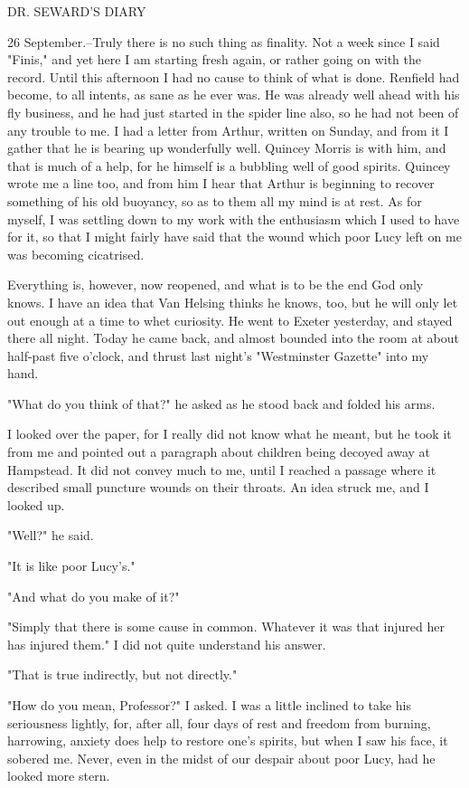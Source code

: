 DR. SEWARD'S DIARY 

26 September.--Truly there is no such thing as finality. Not a week since I said "Finis," and yet here I am starting fresh again, or rather going on with the record. Until this afternoon I had no cause to think of what is done. Renfield had become, to all intents, as sane as he ever was. He was already well ahead with his fly business, and he had just started in the spider line also, so he had not been of any trouble to me. I had a letter from Arthur, written on Sunday, and from it I gather that he is bearing up wonderfully well. Quincey Morris is with him, and that is much of a help, for he himself is a bubbling well of good spirits. Quincey wrote me a line too, and from him I hear that Arthur is beginning to recover something of his old buoyancy, so as to them all my mind is at rest. As for myself, I was settling down to my work with the enthusiasm which I used to have for it, so that I might fairly have said that the wound which poor Lucy left on me was becoming cicatrised. 

Everything is, however, now reopened, and what is to be the end God only knows. I have an idea that Van Helsing thinks he knows, too, but he will only let out enough at a time to whet curiosity. He went to Exeter yesterday, and stayed there all night. Today he came back, and almost bounded into the room at about half-past five o'clock, and thrust last night's "Westminster Gazette" into my hand. 

"What do you think of that?" he asked as he stood back and folded his arms. 

I looked over the paper, for I really did not know what he meant, but he took it from me and pointed out a paragraph about children being decoyed away at Hampstead. It did not convey much to me, until I reached a passage where it described small puncture wounds on their throats. An idea struck me, and I looked up. 

"Well?" he said. 

"It is like poor Lucy's." 

"And what do you make of it?" 

"Simply that there is some cause in common. Whatever it was that injured her has injured them." I did not quite understand his answer. 

"That is true indirectly, but not directly." 

"How do you mean, Professor?" I asked. I was a little inclined to take his seriousness lightly, for, after all, four days of rest and freedom from burning, harrowing, anxiety does help to restore one's spirits, but when I saw his face, it sobered me. Never, even in the midst of our despair about poor Lucy, had he looked more stern. 

